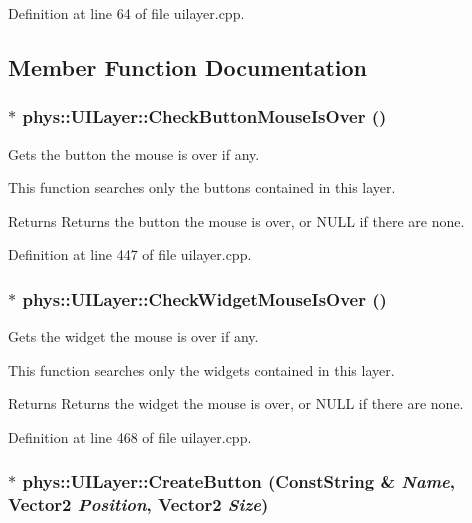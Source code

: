 Definition at line 64 of file uilayer.cpp.



\subsection{Member Function Documentation}
\hypertarget{classphys_1_1UILayer_ac28c19dea53d2b89c5c09a2e29ce8c6d}{
\subsubsection[{CheckButtonMouseIsOver}]{ $\ast$ phys::UILayer::CheckButtonMouseIsOver ()}}
\label{da/d48/classphys_1_1UILayer_ac28c19dea53d2b89c5c09a2e29ce8c6d}


Gets the button the mouse is over if any. 

This function searches only the buttons contained in this layer. \begin{DoxyReturn}{Returns}
Returns the button the mouse is over, or NULL if there are none. 
\end{DoxyReturn}


Definition at line 447 of file uilayer.cpp.

\hypertarget{classphys_1_1UILayer_ae121ca4d2ebb6fec7351a5c1eaab3dfc}{
\subsubsection[{CheckWidgetMouseIsOver}]{ $\ast$ phys::UILayer::CheckWidgetMouseIsOver ()}}
\label{da/d48/classphys_1_1UILayer_ae121ca4d2ebb6fec7351a5c1eaab3dfc}


Gets the widget the mouse is over if any. 

This function searches only the widgets contained in this layer. \begin{DoxyReturn}{Returns}
Returns the widget the mouse is over, or NULL if there are none. 
\end{DoxyReturn}


Definition at line 468 of file uilayer.cpp.

\hypertarget{classphys_1_1UILayer_a270b0e2e2d7e48efe0df54f769f930e4}{
\subsubsection[{CreateButton}]{ $\ast$ phys::UILayer::CreateButton ({\bf ConstString} \& {\em Name}, \/  {\bf Vector2} {\em Position}, \/  {\bf Vector2} {\em Size})}}
\label{da/d48/classphys_1_1UILayer_a270b0e2e2d7e48efe0df54f769f930e4}


